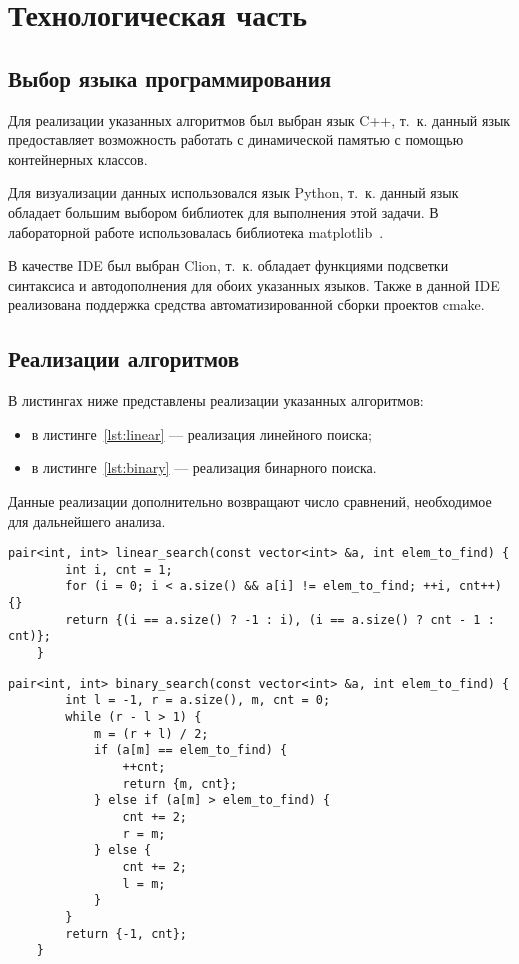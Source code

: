 \chapter{Технологическая часть}

\section{Выбор языка программирования}

Для реализации указанных алгоритмов был выбран язык C++, т.~к. данный язык предоставляет возможность работать с динамической памятью с помощью контейнерных классов.

Для визуализации данных использовался язык Python, т.~к. данный язык обладает большим выбором библиотек для выполнения этой задачи. В лабораторной работе использовалась библиотека matplotlib~\cite{plt}.

В качестве IDE был выбран Clion, т.~к. обладает функциями подсветки синтаксиса и автодополнения для обоих указанных языков. Также в данной IDE реализована поддержка средства автоматизированной сборки проектов cmake.

\section{Реализации алгоритмов}

В листингах ниже представлены реализации указанных алгоритмов:
\begin{itemize}[label=---]
	\item в листинге~\ref{lst:linear} --- реализация линейного поиска;
	\item в листинге~\ref{lst:binary} --- реализация бинарного поиска.
\end{itemize}

Данные реализации дополнительно возвращают число сравнений, необходимое для дальнейшего анализа.
\clearpage
\begin{lstlisting}[caption={Функция линейного поиска}, label=lst:linear]
	pair<int, int> linear_search(const vector<int> &a, int elem_to_find) {
		int i, cnt = 1;
		for (i = 0; i < a.size() && a[i] != elem_to_find; ++i, cnt++) {}
		return {(i == a.size() ? -1 : i), (i == a.size() ? cnt - 1 : cnt)};
	}
\end{lstlisting}
\begin{lstlisting}[caption={Функция бинарного поиска}, label=lst:binary]
	pair<int, int> binary_search(const vector<int> &a, int elem_to_find) {
		int l = -1, r = a.size(), m, cnt = 0;
		while (r - l > 1) {
			m = (r + l) / 2;
			if (a[m] == elem_to_find) {
				++cnt;
				return {m, cnt};
			} else if (a[m] > elem_to_find) {
				cnt += 2;
				r = m;
			} else {
				cnt += 2;
				l = m;
			}
		}
		return {-1, cnt};
	}
\end{lstlisting}

